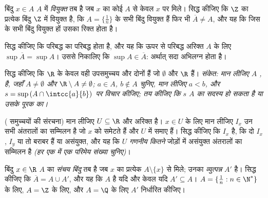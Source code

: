 \begin{exercise}[$\star\star$]\label{exo:b1:topology:7}
बिंदु $x \in A$ $A$ में \emph{वियुक्त} तब है जब $x$ का कोई  $A$ से
केवल $x$ पर मिले। सिद्ध कीजिए कि $\Z$ का प्रत्येक बिंदु $\Z$ में वियुक्त है,
कि $A = \{\frac1n\}$ के सभी बिंदु वियुक्त हैं फिर भी $\overline A \neq A$,
और यह कि जिस  के सभी बिंदु वियुक्त हों उसका  रिक्त होता है।
\end{exercise}

\begin{exercise}[$\star\star$]\label{exo:b1:topology:8}
सिद्ध कीजिए कि परिबद्ध  का  परिबद्ध होता है, और यह कि ऊपर से
परिबद्ध अरिक्त $A$ के लिए $\sup \overline A = \sup A$। उससे निकालिए कि $\sup
A \in \overline A$: अर्थात्  सदा अभिलग्न होता है।
\end{exercise}

\begin{exercise}[$\star\star\star$]\label{exo:b1:topology:9}
सिद्ध कीजिए कि $\R$ के केवल वही उपसमुच्चय  और  दोनों हैं जो
$\emptyset$ और $\R$ हैं। \emph{संकेत: मान लीजिए $A$ ,  है, जहाँ $A
\neq \emptyset$ और $\R \setminus A \neq \emptyset$; $a \in A$, $b \notin A$
चुनिए, मान लीजिए $a < b$, और $s = \sup\,(A \cap \intcc{a}{b})$ पर विचार
कीजिए; तय कीजिए कि $s$ $A$ का सदस्य हो सकता है या उसके पूरक का।}
\end{exercise}

\begin{exercise}[$\star\star\star$]\label{exo:b1:topology:10}
( समुच्चयों की संरचना) मान लीजिए $U \subseteq \R$  और अरिक्त है।
$x \in U$ के लिए मान लीजिए $I_x$ उन सभी  अंतरालों का सम्मिलन है जो $x$
को समेटते हैं और $U$ में समाए हैं। सिद्ध कीजिए कि $I_x$   है, कि
दो  $I_x$, $I_y$ या तो बराबर हैं या असंयुक्त, और यह कि $U$
\emph{गणनीय कितने} जोड़ों में असंयुक्त  अंतरालों का सम्मिलन है
\emph{(हर एक में एक परिमेय संख्या चुनिए)}।
\end{exercise}

\begin{exercise}[$\star\star$]\label{exo:b1:topology:11}
बिंदु $x \in \R$ $A$ का \emph{संचय बिंदु} तब है जब $x$ का प्रत्येक 
$A \setminus \{x\}$ से मिले; उनका  \emph{व्युत्पन्न } $A'$ है।
सिद्ध कीजिए कि $\overline A = A \cup A'$, और यह कि $A$  है यदि और केवल
यदि $A' \subseteq A$। $A = \{\frac 1n : n \in \N^*\}$ के लिए, $A = \Z$ के
लिए, और $A = \Q$ के लिए $A'$ निर्धारित कीजिए।
\end{exercise}

